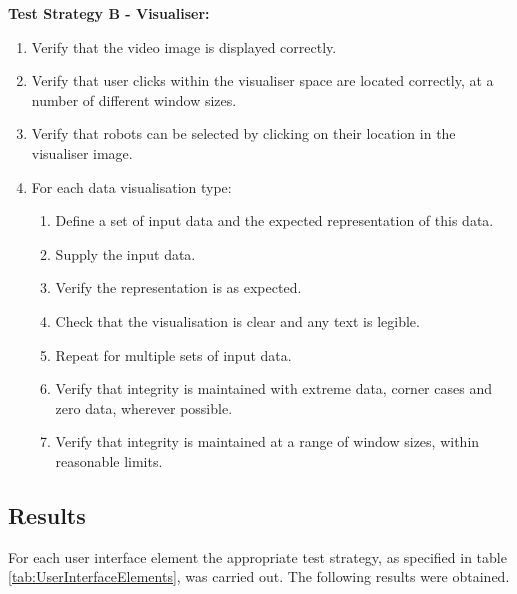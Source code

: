 \textbf{Test Strategy B - Visualiser:}

\begin{enumerate}
 \item Verify that the video image is displayed correctly.
 \item Verify that user clicks within the visualiser space are located correctly, at a number of different window sizes.
 \item Verify that robots can be selected by clicking on their location in the visualiser image.
 \item For each data visualisation type:
 \begin{enumerate}
  \item Define a set of input data and the expected representation of this data.
  \item Supply the input data.
  \item Verify the representation is as expected.
  \item Check that the visualisation is clear and any text is legible.
  \item Repeat for multiple sets of input data.
  \item Verify that integrity is maintained with extreme data, corner cases and zero data, wherever possible.
  \item Verify that integrity is maintained at a range of window sizes, within reasonable limits.
 \end{enumerate}
\end{enumerate}


\subsection{Results}
For each user interface element the appropriate test strategy, as specified in table \ref{tab:UserInterfaceElements}, was carried out. The following results were obtained.

